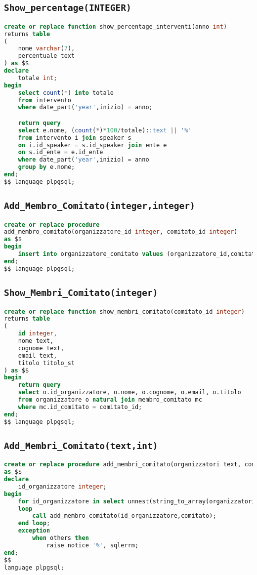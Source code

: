 \subsection{\texttt{Show\_percentage(INTEGER)}}
\begin{lstlisting}[language=SQL,style=mystyle]
create or replace function show_percentage_interventi(anno int)
returns table
(
    nome varchar(7),
    percentuale text
) as $$
declare
    totale int;
begin
    select count(*) into totale
    from intervento
    where date_part('year',inizio) = anno;

    return query
    select e.nome, (count(*)*100/totale)::text || '%'
    from intervento i join speaker s 
    on i.id_speaker = s.id_speaker join ente e 
    on s.id_ente = e.id_ente
    where date_part('year',inizio) = anno
    group by e.nome;
end;
$$ language plpgsql;
\end{lstlisting}
\subsection{\texttt{Add\_Membro\_Comitato(integer,integer)}}
\begin{lstlisting}[language=SQL,style=mystyle]
create or replace procedure 
add_membro_comitato(organizzatore_id integer, comitato_id integer)
as $$
begin
    insert into organizzatore_comitato values (organizzatore_id,comitato_id);
end;
$$ language plpgsql;
\end{lstlisting}
\subsection{\texttt{Show\_Membri\_Comitato(integer)}}
\begin{lstlisting}[language=SQL,style=mystyle]
create or replace function show_membri_comitato(comitato_id integer)
returns table
(
    id integer,
    nome text,
    cognome text,
    email text,
    titolo titolo_st
) as $$
begin
    return query
    select o.id_organizzatore, o.nome, o.cognome, o.email, o.titolo
    from organizzatore o natural join membro_comitato mc
    where mc.id_comitato = comitato_id;
end;
$$ language plpgsql;
\end{lstlisting}
\subsection{\texttt{Add\_Membri\_Comitato(text,int)}}
\begin{lstlisting}[language=SQL,style=mystyle]
create or replace procedure add_membri_comitato(organizzatori text, comitato integer)
as $$
declare
    id_organizzatore integer;
begin
    for id_organizzatore in select unnest(string_to_array(organizzatori,','))::integer
    loop
        call add_membro_comitato(id_organizzatore,comitato);
    end loop;
    exception
        when others then
            raise notice '%', sqlerrm;
end;
$$
language plpgsql;


\end{lstlisting}
